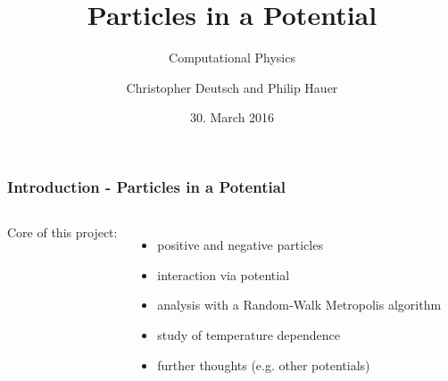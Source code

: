 \documentclass[mathserif,serif]{beamer}
\author{Christopher Deutsch and Philip Hauer}
\title{Particles in a Potential}
\date{30. March 2016}
\subtitle{{\small Computational Physics}}
\begin{document}
\frame[plain]{\titlepage}
\setcounter{framenumber}{0}
\begin{frame}
	\frametitle{Introduction - Particles in a Potential}
		\begin{columns}
			\centering
			Core of this project:
			\begin{itemize}
				\item positive and negative particles
				\item interaction via potential
				\item analysis with a Random-Walk Metropolis algorithm
				\item study of temperature dependence
				\item further thoughts (e.g. other potentials)
			\end{itemize}
			
	\end{columns}
\end{frame}





















\end{document}
